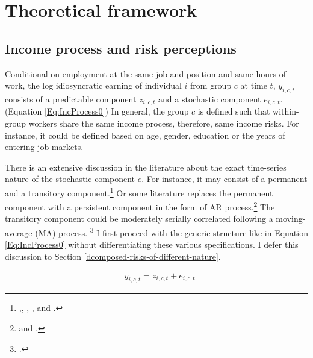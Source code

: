 
    \hypertarget{theoretical-framework}{%
\section{Theoretical framework}\label{theoretical-framework}}

\hypertarget{income-process-and-risk-perceptions}{%
\subsection{Income process and risk
perceptions}\label{income-process-and-risk-perceptions}}

Conditional on employment at the same job and position and same hours of work, the log idiosyncratic earning of individual \(i\) from group \(c\) at time \(t\), $y_{i,c,t}$ consists of a predictable component $z_{i,c,t}$ and a stochastic component $e_{i,c,t}$. (Equation \ref{Eq:IncProcess0}) In general, the group \(c\) is defined such that within-group workers share the same income process, therefore, same income risks. For instance, it could be defined based on age, gender, education or the years of entering job markets. 

There is an extensive discussion in the literature about the exact time-series nature of the stochastic component $e$. For instance, it may consist of a permanent and a transitory component.\footnote{\cite{abowd1989covariance},\cite{gottschalk1994growth}, \cite{carroll1997nature}, \cite{blundell_consumption_2008}, and \cite{kaplan2010much}.} Or some literature replaces the permanent component with a persistent component in the form of AR process.\footnote{\cite{storesletten2004cyclical} and \cite{guvenen_empirical_2009}.} The transitory component could be moderately serially correlated following a moving-average (MA) process. \footnote{\cite{meghir2004income}.} I first proceed with the generic structure like in Equation \ref{Eq:IncProcess0} without differentiating these various specifications. I defer this discussion to Section \ref{dcomposed-risks-of-different-nature}. 

\begin{equation}
\begin{split}
\label{Eq:IncProcess0}
& y_{i,c,t} = z_{i,c,t}+ e_{i,c,t} 
\end{split}
\end{equation}


